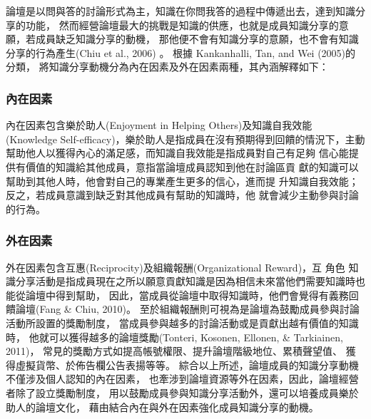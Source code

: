 論壇是以問與答的討論形式為主，知識在你問我答的過程中傳遞出去，達到知識分享的功能，
然而經營論壇最大的挑戰是知識的供應，也就是成員知識分享的意願，若成員缺乏知識分享的動機，
那他便不會有知識分享的意願，也不會有知識分享的行為產生(Chiu et al., 2006) 。
 根據 Kankanhalli, Tan, and Wei (2005)的分類，
 將知識分享動機分為內在因素及外在因素兩種，其內涵解釋如下：




\subsubsection{內在因素} 
內在因素包含樂於助人(Enjoyment in Helping Others)及知識自我效能
(Knowledge Self-efficacy)，樂於助人是指成員在沒有預期得到回饋的情況下，主動幫助他人以獲得內心的滿足感，而知識自我效能是指成員對自己有足夠
信心能提供有價值的知識給其他成員，意指當論壇成員認知到他在討論區貢
獻的知識可以幫助到其他人時，他會對自己的專業產生更多的信心，進而提
升知識自我效能；反之，若成員意識到缺乏對其他成員有幫助的知識時，他
就會減少主動參與討論的行為。

\subsubsection{外在因素} 
外在因素包含互惠(Reciprocity)及組織報酬(Organizational Reward)，互
角色 知識分享活動是指成員現在之所以願意貢獻知識是因為相信未來當他們需要知識時也能從論壇中得到幫助，
因此，當成員從論壇中取得知識時，他們會覺得有義務回饋論壇(Fang \& Chiu, 2010)。
至於組織報酬則可視為是論壇為鼓勵成員參與討論活動所設置的獎勵制度，
當成員參與越多的討論活動或是貢獻出越有價值的知識時，
他就可以獲得越多的論壇獎勵(Tonteri, Kosonen, Ellonen, \& Tarkiainen, 2011)，
常見的獎勵方式如提高帳號權限、提升論壇階級地位、累積聲望值、
獲得虛擬貨幣、於佈告欄公告表揚等等。 
 綜合以上所述，論壇成員的知識分享動機不僅涉及個人認知的內在因素，
 也牽涉到論壇資源等外在因素，因此，論壇經營者除了設立獎勵制度，
 用以鼓勵成員參與知識分享活動外，還可以培養成員樂於助人的論壇文化，
 藉由結合內在與外在因素強化成員知識分享的動機。



\EndChapter